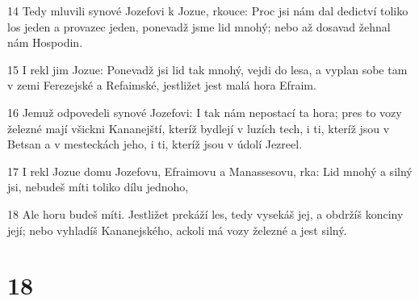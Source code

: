 \par 14 Tedy mluvili synové Jozefovi k Jozue, rkouce: Proc jsi nám dal dedictví toliko los jeden a provazec jeden, ponevadž jsme lid mnohý; nebo až dosavad žehnal nám Hospodin.
\par 15 I rekl jim Jozue: Ponevadž jsi lid tak mnohý, vejdi do lesa, a vyplan sobe tam v zemi Ferezejské a Refaimské, jestližet jest malá hora Efraim.
\par 16 Jemuž odpovedeli synové Jozefovi: I tak nám nepostací ta hora; pres to vozy železné mají všickni Kananejští, kteríž bydlejí v luzích tech, i ti, kteríž jsou v Betsan a v mesteckách jeho, i ti, kteríž jsou v údolí Jezreel.
\par 17 I rekl Jozue domu Jozefovu, Efraimovu a Manassesovu, rka: Lid mnohý a silný jsi, nebudeš míti toliko dílu jednoho,
\par 18 Ale horu budeš míti. Jestližet prekáží les, tedy vysekáš jej, a obdržíš konciny její; nebo vyhladíš Kananejského, ackoli má vozy železné a jest silný.

\chapter{18}

